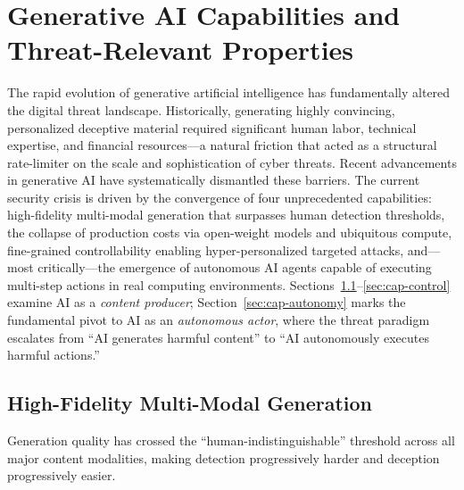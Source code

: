 
\section{Generative AI Capabilities and Threat-Relevant Properties}
\label{sec:capabilities}

The rapid evolution of generative artificial intelligence has fundamentally altered the digital threat landscape. Historically, generating highly convincing, personalized deceptive material required significant human labor, technical expertise, and financial resources---a natural friction that acted as a structural rate-limiter on the scale and sophistication of cyber threats. Recent advancements in generative AI have systematically dismantled these barriers. The current security crisis is driven by the convergence of four unprecedented capabilities: high-fidelity multi-modal generation that surpasses human detection thresholds, the collapse of production costs via open-weight models and ubiquitous compute, fine-grained controllability enabling hyper-personalized targeted attacks, and---most critically---the emergence of autonomous AI agents capable of executing multi-step actions in real computing environments. Sections~\ref{sec:cap-fidelity}--\ref{sec:cap-control} examine AI as a \emph{content producer}; Section~\ref{sec:cap-autonomy} marks the fundamental pivot to AI as an \emph{autonomous actor}, where the threat paradigm escalates from ``AI generates harmful content'' to ``AI autonomously executes harmful actions.''


\subsection{High-Fidelity Multi-Modal Generation}
\label{sec:cap-fidelity}

Generation quality has crossed the ``human-indistinguishable'' threshold across all major content modalities, making detection progressively harder and deception progressively easier.

